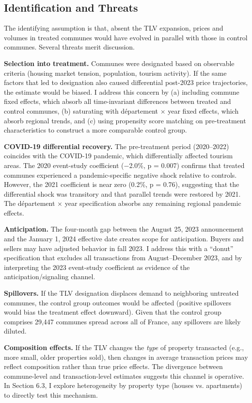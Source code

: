 \documentclass[12pt]{article}
\begin{document}
\subsection{Identification and Threats}

The identifying assumption is that, absent the TLV expansion, prices and volumes in treated communes would have evolved in parallel with those in control communes. Several threats merit discussion.

\textbf{Selection into treatment.} Communes were designated based on observable criteria (housing market tension, population, tourism activity). If the same factors that led to designation also caused differential post-2023 price trajectories, the estimate would be biased. I address this concern by (a) including commune fixed effects, which absorb all time-invariant differences between treated and control communes, (b) saturating with d\'epartement $\times$ year fixed effects, which absorb regional trends, and (c) using propensity score matching on pre-treatment characteristics to construct a more comparable control group.

\textbf{COVID-19 differential recovery.} The pre-treatment period (2020--2022) coincides with the COVID-19 pandemic, which differentially affected tourism areas. The 2020 event-study coefficient ($-$2.0\%, p = 0.007) confirms that treated communes experienced a pandemic-specific negative shock relative to controls. However, the 2021 coefficient is near zero (0.2\%, p = 0.76), suggesting that the differential shock was transitory and that parallel trends were restored by 2021. The d\'epartement $\times$ year specification absorbs any remaining regional pandemic effects.

\textbf{Anticipation.} The four-month gap between the August 25, 2023 announcement and the January 1, 2024 effective date creates scope for anticipation. Buyers and sellers may have adjusted behavior in fall 2023. I address this with a ``donut'' specification that excludes all transactions from August--December 2023, and by interpreting the 2023 event-study coefficient as evidence of the anticipation/signaling channel.

\textbf{Spillovers.} If the TLV designation displaces demand to neighboring untreated communes, the control group outcomes would be affected (positive spillovers would bias the treatment effect downward). Given that the control group comprises 29,447 communes spread across all of France, any spillovers are likely diluted.

\textbf{Composition effects.} If the TLV changes the \textit{type} of property transacted (e.g., more small, older properties sold), then changes in average transaction prices may reflect composition rather than true price effects. The divergence between commune-level and transaction-level estimates suggests this channel is operative. In Section 6.3, I explore heterogeneity by property type (houses vs. apartments) to directly test this mechanism.
\end{document}
